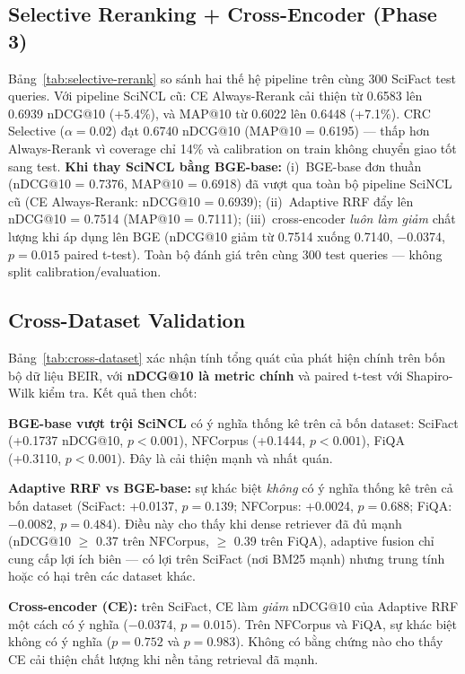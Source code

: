 

\subsection{Selective Reranking + Cross-Encoder (Phase 3)}
\label{sec:results:selective}

Bảng~\ref{tab:selective-rerank} so sánh hai thế hệ pipeline trên cùng 300 SciFact test queries. Với
pipeline SciNCL cũ: CE Always-Rerank cải thiện từ 0.6583 lên 0.6939 nDCG@10 (+5.4\%), và MAP@10 từ
0.6022 lên 0.6448 (+7.1\%). CRC Selective ($\alpha{=}0.02$) đạt 0.6740 nDCG@10 (MAP@10 = 0.6195) ---
thấp hơn Always-Rerank vì coverage chỉ 14\% và calibration on train không chuyển giao tốt sang test.
\textbf{Khi thay SciNCL bằng BGE-base:} (i)~BGE-base đơn thuần (nDCG@10 = 0.7376, MAP@10 = 0.6918)
đã vượt qua toàn bộ pipeline SciNCL cũ (CE Always-Rerank: nDCG@10 = 0.6939); (ii)~Adaptive RRF đẩy
lên nDCG@10 = 0.7514 (MAP@10 = 0.7111); (iii)~cross-encoder \emph{luôn làm giảm} chất lượng khi áp
dụng lên BGE (nDCG@10 giảm từ 0.7514 xuống 0.7140, $-$0.0374, $p=0.015$ paired t-test). Toàn bộ
đánh giá trên cùng 300 test queries --- không split calibration/evaluation.



\subsection{Cross-Dataset Validation}
\label{sec:results:cross-dataset}

Bảng~\ref{tab:cross-dataset} xác nhận tính tổng quát của phát hiện chính trên bốn bộ dữ liệu BEIR, với
\textbf{nDCG@10 là metric chính} và paired t-test với Shapiro-Wilk kiểm tra. Kết quả then chốt:

\textbf{BGE-base vượt trội SciNCL} có ý nghĩa thống kê trên cả bốn dataset: SciFact (+0.1737 nDCG@10,
$p<0.001$), NFCorpus (+0.1444, $p<0.001$), FiQA (+0.3110, $p<0.001$). Đây là cải thiện mạnh và nhất quán.

\textbf{Adaptive RRF vs BGE-base:} sự khác biệt \emph{không} có ý nghĩa thống kê trên cả bốn dataset
(SciFact: +0.0137, $p=0.139$; NFCorpus: +0.0024, $p=0.688$; FiQA: $-$0.0082, $p=0.484$). Điều này
cho thấy khi dense retriever đã đủ mạnh (nDCG@10 $\ge$ 0.37 trên NFCorpus, $\ge$ 0.39 trên FiQA),
adaptive fusion chỉ cung cấp lợi ích biên --- có lợi trên SciFact (nơi BM25 mạnh) nhưng trung tính
hoặc có hại trên các dataset khác.

\textbf{Cross-encoder (CE):} trên SciFact, CE làm \emph{giảm} nDCG@10 của Adaptive RRF một cách có ý
nghĩa ($-$0.0374, $p=0.015$). Trên NFCorpus và FiQA, sự khác biệt không có ý nghĩa ($p=0.752$ và
$p=0.983$). Không có bằng chứng nào cho thấy CE cải thiện chất lượng khi nền tảng retrieval đã mạnh.

